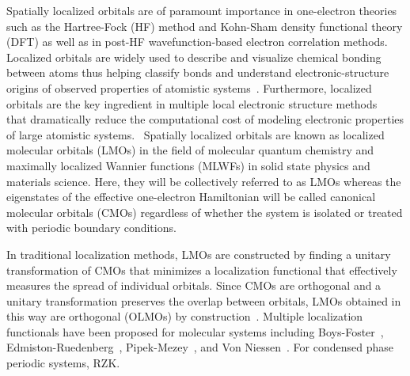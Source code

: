 \documentclass[aps,prl,reprint,amsmath,amssymb]{revtex4-1}
\begin{document}
Spatially localized orbitals are of paramount importance in one-electron theories such as the Hartree-Fock (HF) method and Kohn-Sham density functional theory (DFT) as well as in post-HF wavefunction-based electron correlation methods.
Localized orbitals are widely used to describe and visualize chemical bonding between atoms thus helping classify bonds and understand electronic-structure origins of observed properties of atomistic systems~\cite{RZK}. 
Furthermore, localized orbitals are the key ingredient in multiple local electronic structure methods~\cite{goedecker1994efficient, bowler2012methods, zalesny2011linear, pulay1986orbital, saebo2001low, pisani2005local, hampel1996local, forner1997numerical} that dramatically reduce the computational cost of modeling electronic properties of large atomistic systems.~\cite{saebo1993local, schutz1999low, hetzer2000low, schutz2001low}
Spatially localized orbitals are known as localized molecular orbitals (LMOs) in the field of molecular quantum chemistry and maximally localized Wannier functions (MLWFs) in solid state physics and materials science. 
Here, they will be collectively referred to as LMOs whereas the eigenstates of the effective one-electron Hamiltonian will be called canonical molecular orbitals (CMOs) regardless of whether the system is isolated or treated with periodic boundary conditions.

%

In traditional localization methods, LMOs are constructed by finding a unitary transformation of CMOs that minimizes a localization functional that effectively measures the spread of individual orbitals. 
Since CMOs are orthogonal and a unitary transformation preserves the overlap between orbitals, LMOs obtained in this way are orthogonal (OLMOs) by construction~\cite{weinstein1971localized}.
Multiple localization functionals have been proposed for molecular systems including Boys-Foster~\cite{boys1960construction}, Edmiston-Ruedenberg~\cite{bytautas2002electron, bytautas2003split, edmiston1963localized}, Pipek-Mezey~\cite{pipek1989a_fast}, and Von Niessen~\cite{niessen1972density}. For condensed phase periodic systems, RZK. ~\cite{marzari2012maximally}
\end{document}
